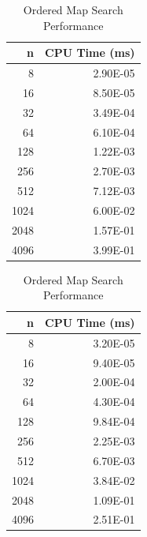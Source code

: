 \documentclass{article}
\begin{document}
\begin{table}[h]
    \centering
    \begin{minipage}{0.48\textwidth}
        \centering
        \caption{Skip List Search Performance}
        \begin{tabular}{rr}
            \toprule
            \textbf{n} & \textbf{CPU Time (ms)} \\
            \midrule
            8       & 2.90E-05  \\
            16      & 8.50E-05  \\
            32      & 3.49E-04  \\
            64      & 6.10E-04  \\
            128     & 1.22E-03  \\
            256     & 2.70E-03  \\
            512     & 7.12E-03  \\
            1024    & 6.00E-02  \\
            2048    & 1.57E-01  \\
            4096    & 3.99E-01  \\
            \bottomrule
        \end{tabular}
        \label{tab:sl_search}
    \end{minipage}%
    \hfill
    \begin{minipage}{0.48\textwidth}
        \centering
        \caption{Ordered Map Search Performance}
        \begin{tabular}{rr}
            \toprule
            \textbf{n} & \textbf{CPU Time (ms)} \\
            \midrule
            8       & 3.20E-05  \\
            16      & 9.40E-05  \\
            32      & 2.00E-04  \\
            64      & 4.30E-04  \\
            128     & 9.84E-04  \\
            256     & 2.25E-03  \\
            512     & 6.70E-03  \\
            1024    & 3.84E-02  \\
            2048    & 1.09E-01  \\
            4096    & 2.51E-01  \\
            \bottomrule
        \end{tabular}
        \label{tab:om_search}
    \end{minipage}
\end{table}
\FloatBarrier
\end{document}
